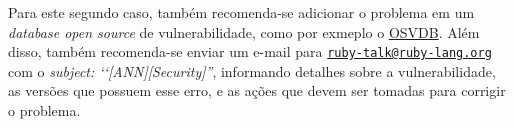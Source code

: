 Para este segundo caso, também recomenda-se adicionar o problema em um \emph{database open source}
de vulnerabilidade, como por exmeplo o \href{http://osvdb.org/}{OSVDB}. Além disso, também recomenda-se
enviar um e-mail para \href{mailto:ruby-talk@ruby-lang.org} {\nolinkurl{ruby-talk@ruby-lang.org} } com o
\emph{subject: ‘‘[ANN][Security]''}, informando detalhes sobre a vulnerabilidade, as versões que
possuem esse erro, e as ações que devem ser tomadas para corrigir o problema.